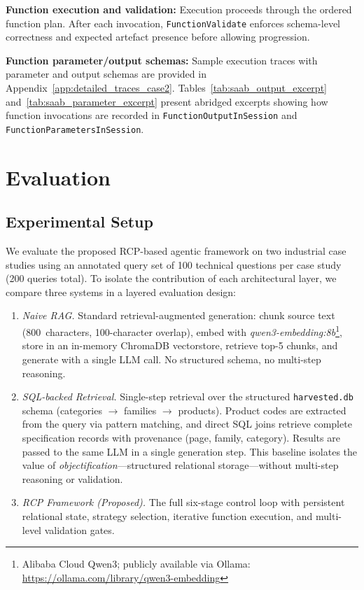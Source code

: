 \documentclass[largeformat]{interact}
\begin{document}
\noindent \textbf{Function execution and validation:}
Execution proceeds through the ordered function plan. After each invocation, \texttt{FunctionValidate} enforces schema-level correctness and expected artefact presence before allowing progression.

\noindent \textbf{Function parameter/output schemas:}
Sample execution traces with parameter and output schemas are provided in Appendix~\ref{app:detailed_traces_case2}. Tables~\ref{tab:saab_output_excerpt} and~\ref{tab:saab_parameter_excerpt} present abridged excerpts showing how function invocations are recorded in \texttt{FunctionOutputInSession} and \texttt{FunctionParametersInSession}.



\section{Evaluation}
\label{sec:evaluation}
\subsection{Experimental Setup}
\label{subsec:experimental_setup}
We evaluate the proposed RCP-based agentic framework on two industrial case studies using an annotated query set of 100 technical questions per case study (200 queries total). To isolate the contribution of each architectural layer, we compare three systems in a layered evaluation design:

\begin{enumerate}[label=\texttt{B\arabic*:}, leftmargin=3.5em]
    \item \textit{Naive RAG.} Standard retrieval-augmented generation: chunk source text (800~characters, 100-character overlap), embed with \textit{qwen3-embedding:8b}\footnote{Alibaba Cloud Qwen3; publicly available via Ollama: \url{https://ollama.com/library/qwen3-embedding}}, store in an in-memory ChromaDB vectorstore, retrieve top-5 chunks, and generate with a single LLM call. No structured schema, no multi-step reasoning.
    \item \textit{SQL-backed Retrieval.} Single-step retrieval over the structured \texttt{harvested.db} schema (categories $\rightarrow$ families $\rightarrow$ products). Product codes are extracted from the query via pattern matching, and direct SQL joins retrieve complete specification records with provenance (page, family, category). Results are passed to the same LLM in a single generation step. This baseline isolates the value of \emph{objectification}---structured relational storage---without multi-step reasoning or validation.
    \item \textit{RCP Framework (Proposed).} The full six-stage control loop with persistent relational state, strategy selection, iterative function execution, and multi-level validation gates.
\end{enumerate}
\end{document}
